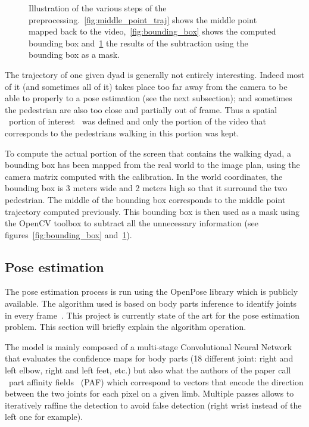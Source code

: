 \documentclass[12pt,a4paper,twoside]{article}
\begin{document}
\begin{figure}
\begin{subfigure}[b]{0.45\textwidth}
        \caption{}
        \label{fig:masked}
    \end{subfigure}
    \caption{Illustration of the various steps of the preprocessing.~\ref{fig:middle_point_traj} shows the middle point mapped back to the video,~\ref{fig:bounding_box} shows the computed bounding box and~\ref{fig:masked} the results of the subtraction using the bounding box as a mask.}\label{fig:preprocessing}
\end{figure}

The trajectory of one given dyad is generally not entirely interesting. Indeed most of it (and sometimes all of it) takes place too far away from the camera to be able to properly to a pose estimation (see the next subsection); and sometimes the pedestrian are also too close and partially out of frame. Thus a spatial \guillemotleft~portion of interest \guillemotright~was defined and only the portion of the video that corresponds to the pedestrians walking in this portion was kept.

To compute the actual portion of the screen that contains the walking dyad, a bounding box has been mapped from the real world to the image plan, using the camera matrix computed with the calibration. In the world coordinates, the bounding box is 3 meters wide and 2 meters high so that it surround the two pedestrian. The middle of the bounding box corresponds to the middle point trajectory computed previously. This bounding box is then used as a mask using the OpenCV toolbox to subtract all the unnecessary information (see figures~\ref{fig:bounding_box} and~\ref{fig:masked}).

\subsection{Pose estimation}
The pose estimation process is run using the OpenPose library which is publicly available. The algorithm used is based on body parts inference to identify joints in every frame~\cite{Cao2016}. This project is currently state of the art for the pose estimation problem. This section will briefly explain the algorithm operation.

The model is mainly composed of a multi-stage Convolutional Neural Network that evaluates the confidence maps for body parts (18 different joint: right and left elbow, right and left feet, etc.) but also what the authors of the paper call \guillemotleft~part affinity fields \guillemotright~(PAF) which correspond to vectors that encode the direction between the two joints for each pixel on a given limb. Multiple passes allows to iteratively raffine the detection to avoid false detection (right wrist instead of the left one for example). 
\end{document}
